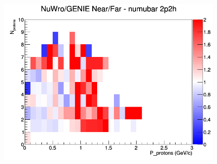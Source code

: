 \documentclass[12pt]{article}
\begin{document}
\begin{figure}[h]
\endminipage
{}
\includegraphics[width=\linewidth]{N_P/nominal/protons/ratios/2p2h_NuWro_GENIE_numubar_NF_N_P.png}
\endminipage
\newline
\end{figure}
\clearpage
\end{document}
